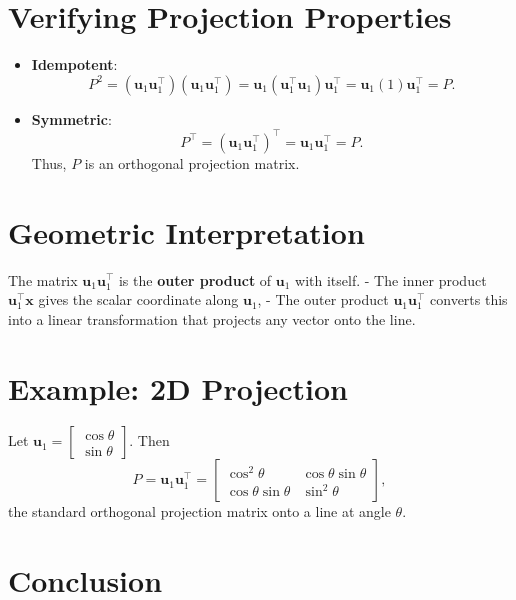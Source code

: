 \documentclass{article}
\begin{document}
\section*{Verifying Projection Properties}

\begin{itemize}
\item \textbf{Idempotent}: 
    \[
    P^2 = (\mathbf{u}_1 \mathbf{u}_1^\top)(\mathbf{u}_1 \mathbf{u}_1^\top)
    = \mathbf{u}_1 (\mathbf{u}_1^\top \mathbf{u}_1) \mathbf{u}_1^\top
    = \mathbf{u}_1 (1) \mathbf{u}_1^\top = P.
    \]

    \item \textbf{Symmetric}:
    \[
    P^\top = (\mathbf{u}_1 \mathbf{u}_1^\top)^\top = \mathbf{u}_1 \mathbf{u}_1^\top = P.
    \]
Thus, $ P $ is an orthogonal projection matrix.
\end{itemize}

\section*{Geometric Interpretation}

The matrix $ \mathbf{u}_1 \mathbf{u}_1^\top $ is the \textbf{outer product} of $ \mathbf{u}_1 $ with itself.  
- The inner product $ \mathbf{u}_1^\top \mathbf{x} $ gives the scalar coordinate along $ \mathbf{u}_1 $,
- The outer product $ \mathbf{u}_1 \mathbf{u}_1^\top $ converts this into a linear transformation that projects any vector onto the line.

\section*{Example: 2D Projection}

Let $ \mathbf{u}_1 = \begin{bmatrix} \cos \theta \\ \sin \theta \end{bmatrix} $. Then
\[
P = \mathbf{u}_1 \mathbf{u}_1^\top =
\begin{bmatrix}
\cos^2 \theta & \cos \theta \sin \theta \\
\cos \theta \sin \theta & \sin^2 \theta
\end{bmatrix},
\]
the standard orthogonal projection matrix onto a line at angle $ \theta $.

\section*{Conclusion}
\end{document}
